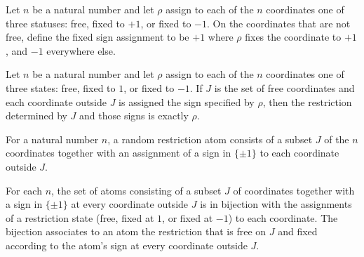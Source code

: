 \begin{definition}
\label{FABL.CoordRestriction.fixedSign}
\leanok
{}
Let $n$ be a natural number and let $\rho$ assign to each of the $n$ coordinates one of
three statuses: free, fixed to $+1$, or fixed to $-1$. On the coordinates that are not
free, define the fixed sign assignment to be $+1$ where $\rho$ fixes the coordinate to
$+1$, and $-1$ everywhere else.
\end{definition}

\begin{theorem}
\label{FABL.coordRestrictionOf_freeCoordinates_fixedSign}
\leanok
{}
Let $n$ be a natural number and let $\rho$ assign to each of the $n$ coordinates one of
three states: free, fixed to $1$, or fixed to $-1$. If $J$ is the set of free
coordinates and each coordinate outside $J$ is assigned the sign specified by $\rho$,
then the restriction determined by $J$ and those signs is exactly $\rho$.
\end{theorem}

\begin{definition}
\label{FABL.RandomRestrictionAtom}
\leanok
{}
For a natural number $n$, a random restriction atom consists of a subset $J$ of the $n$
coordinates together with an assignment of a sign in $\{\pm1\}$ to each coordinate
outside $J$.
\end{definition}

\begin{definition}
\label{FABL.randomRestrictionAtomEquiv}
\leanok
{}
For each $n$, the set of atoms consisting of a subset $J$ of coordinates together with a
sign in $\{\pm1\}$ at every coordinate outside $J$ is in bijection with the assignments
of a restriction state (free, fixed at $1$, or fixed at $-1$) to each coordinate. The
bijection associates to an atom the restriction that is free on $J$ and fixed according
to the atom's sign at every coordinate outside $J$.
\end{definition}

